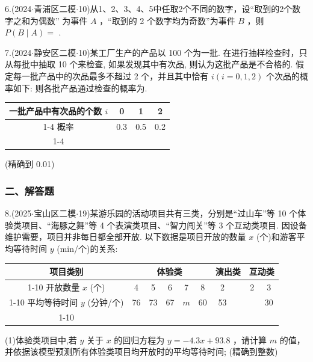 6.(2024$\cdot$青浦区二模$\cdot$10)从1、2、3、4、5中任取2个不同的数字，设“取到的2个数字之和为偶数” 为事件 $A$ ，“取到的 2 个数字均为奇数”为事件 $B$ ，则 $P\left( {B \mid  A}\right)  =$ \blkda[2]{}.

7.(2024$\cdot$静安区二模$\cdot$10)某工厂生产的产品以 100 个为一批. 在进行抽样检查时，只从每批中抽取 10 个来检查, 如果发现其中有次品, 则认为这批产品是不合格的. 假定每一批产品中的次品最多不超过 2 个，并且其中恰有 $i\left( {i = 0,1,2}\right)$ 个次品的概率如下: 则各批产品通过检查的概率为\blkda[2]{}.

\begin{center}

\begin{tabular}{|c|c|c|c|}
\hline
一批产品中有次品的个数 $i$ & 0 & 1 & 2 \\
\cline{1-4}
概率 & 0.3 & 0.5 & 0.2 \\
\cline{1-4}
\hline
\end{tabular}
\end{center}

(精确到 0.01)

\subsubsection*{二、解答题}

8.(2025$\cdot$宝山区二模$\cdot$19)某游乐园的活动项目共有三类，分别是“过山车”等 10 个体验类项目、“海豚之舞”等 4 个表演类项目、“智力闯关”等 3 个互动类项目. 因设备维护需要，项目并非每日都全部开放. 以下数据是项目开放的数量 $x$ (个)和游客平均等待时间 $y$ (min/个)的关系:

\begin{center}

\begin{tabular}{|c|c|c|c|c|c|c|c|c|c|}
\hline
项目类别 & \multicolumn{5}{|c|}{体验类} & \multicolumn{2}{|c|}{演出类} & \multicolumn{2}{|c|}{互动类} \\
\cline{1-10}
开放数量 $x$ (个) & 4 & 5 & 6 & 7 & 8 & 2 & \phantom{X} & 2 & 3 \\
\cline{1-10}
平均等待时间 $y$ (分钟/个) & 76 & 73 & 67 & $m$ & 60 & 53 & \phantom{X} & \phantom{X} & 30 \\
\cline{1-10}
\hline
\end{tabular}
\end{center}

(1)体验类项目中,若 $y$ 关于 $x$ 的回归方程为 $y =  - {4.3x} + {93.8}$ ，请计算 $m$ 的值，并依据该模型预测所有体验类项目均开放时的平均等待时间; (精确到整数)

